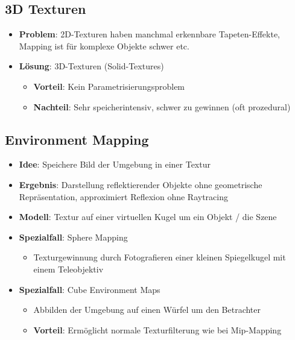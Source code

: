 \documentclass[10pt,a4paper]{article}
\begin{document}
	\subsection{3D Texturen}
	\label{tex:sub:3d_texturen}
	
	\begin{itemize}
		\item \textbf{Problem}: 2D-Texturen haben manchmal erkennbare Tapeten-Effekte, Mapping ist für komplexe Objekte schwer etc.
		\item \textbf{Lösung}: 3D-Texturen (Solid-Textures)
		\begin{itemize}
			\item \textbf{Vorteil}: Kein Parametrisierungsproblem
			\item \textbf{Nachteil}: Sehr speicherintensiv, schwer zu gewinnen (oft prozedural)
		\end{itemize}
	\end{itemize}

	\subsection{Environment Mapping}
	\label{tex:sub:environment_mapping}

	\begin{itemize}
		\item \textbf{Idee}: Speichere Bild der Umgebung in einer Textur
		\item \textbf{Ergebnis}: Darstellung reflektierender Objekte ohne geometrische Repräsentation, approximiert Reflexion ohne Raytracing
		\item \textbf{Modell}: Textur auf einer virtuellen Kugel um ein Objekt / die Szene
		\item \textbf{Spezialfall}: Sphere Mapping
		\begin{itemize}
			\item Texturgewinnung durch Fotografieren einer kleinen Spiegelkugel mit einem Teleobjektiv
		\end{itemize}
		\item \textbf{Spezialfall}: Cube Environment Maps
		\begin{itemize}
			\item Abbilden der Umgebung auf einen Würfel um den Betrachter
			\item \textbf{Vorteil}: Ermöglicht normale Texturfilterung wie bei Mip-Mapping
		\end{itemize}
	\end{itemize}
	
\end{document}
